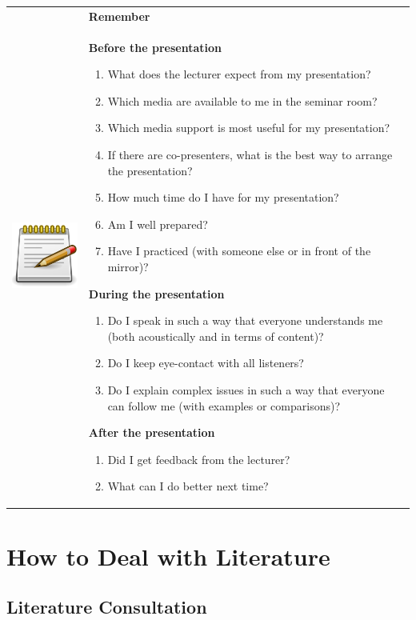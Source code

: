 \documentclass[
  english,
]{scrreprt}
\providecommand{\tightlist}{%
  \setlength{\itemsep}{0pt}\setlength{\parskip}{0pt}}
\newlength{\iconwidth}
\newenvironment{displaybox}[2]{%
    \begin{center}
        \setlength\arrayrulewidth{0.75pt}%
        \arrayrulecolor{white}%
        \renewcommand{\arraystretch}{1.3}%
        \begin{tabular}{p{\iconwidth}p{\linewidth-4\tabcolsep-\iconwidth}}
            \multirow{2}{*}{#2}&\cellcolor{boxheadcol}\textbf{\sffamily\color{white}#1} \\%
            \hhline{~-}%
            &\cellcolor{boxcol}%
}{%
            \\
        \end{tabular}
        \arrayrulecolor{black}
    \end{center}
}
\newenvironment{Remember}{%
\begin{displaybox}{Remember}{\includegraphics[width=\iconwidth]{images/icon-merke}}}%
{\end{displaybox}}
\begin{document}
\begin{Remember}

\textbf{Before the presentation}

\begin{enumerate}
\def\labelenumi{\arabic{enumi}.}
\tightlist
\item
  What does the lecturer expect from my presentation?
\item
  Which media are available to me in the seminar room?
\item
  Which media support is most useful for my presentation?
\item
  If there are co-presenters, what is the best way to arrange the presentation?
\item
  How much time do I have for my presentation?
\item
  Am I well prepared?
\item
  Have I practiced (with someone else or in front of the mirror)?
\end{enumerate}

\textbf{During the presentation}

\begin{enumerate}
\def\labelenumi{\arabic{enumi}.}
\tightlist
\item
  Do I speak in such a way that everyone understands me (both acoustically and in terms of content)?
\item
  Do I keep eye-contact with all listeners?
\item
  Do I explain complex issues in such a way that everyone can follow me (with examples or comparisons)?
\end{enumerate}

\textbf{After the presentation}

\begin{enumerate}
\def\labelenumi{\arabic{enumi}.}
\tightlist
\item
  Did I get feedback from the lecturer?
\item
  What can I do better next time?
\end{enumerate}

\end{Remember}

\chapter{How to Deal with Literature}\label{sec:literature}

\section{Literature Consultation}\label{sec:literature_consultation}
\end{document}
